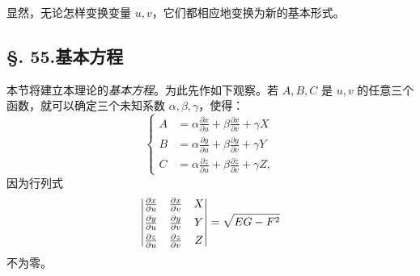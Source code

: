 显然，无论怎样变换变量 \(u,v\)，它们都相应地变换为新的基本形式。

\subsection*{\S. 55.\quad 基本方程}

本节将建立本理论的\emph{基本方程}。为此先作如下观察。若 \(A,B,C\) 是 \(u,v\) 的任意三个函数，就可以确定三个未知系数 \(\alpha,\beta,\gamma\)，使得：
\begin{equation}\tag{a}
\left\{
\begin{aligned}
 A&=\alpha\frac{\partial x}{\partial u}+\beta\frac{\partial x}{\partial v}+\gamma X\\
 B&=\alpha\frac{\partial y}{\partial u}+\beta\frac{\partial y}{\partial v}+\gamma Y\\
 C&=\alpha\frac{\partial z}{\partial u}+\beta\frac{\partial z}{\partial v}+\gamma Z,
\end{aligned}
\right.
\end{equation}
因为行列式
\[
\left|\begin{matrix}
\frac{\partial x}{\partial u}&\frac{\partial x}{\partial v}&X\\[0.35em]
\frac{\partial y}{\partial u}&\frac{\partial y}{\partial v}&Y\\[0.35em]
\frac{\partial z}{\partial u}&\frac{\partial z}{\partial v}&Z\end{matrix}\right|
=\sqrt{EG-F^2}
\]
不为零。

